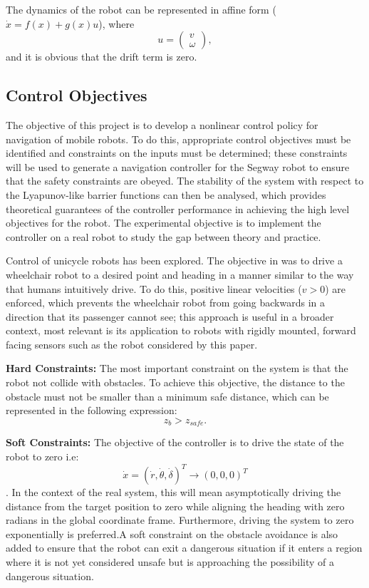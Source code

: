 \documentclass[journal]{IEEEtran}
\begin{document}
The dynamics of the robot can be represented in affine form ($\dot{x}=f(x)+g(x)u$), where \begin{equation}u=\left(\begin{matrix}
v\\\omega \end{matrix}\right),\end{equation} and it is obvious that the drift term is zero. 

\subsection{Control Objectives}
The objective of this project is to develop a nonlinear control policy for navigation of mobile robots. To do this, appropriate control objectives must be identified and constraints on the inputs must be determined; these constraints will be used to generate a navigation controller for the Segway robot to ensure that the safety constraints are obeyed. The stability of the system with respect to the Lyapunov-like barrier functions can then be analysed, which provides theoretical guarantees of the controller performance in achieving the high level objectives for the robot. The experimental objective is to implement the controller on a real robot to study the gap between theory and practice.

Control of unicycle robots has been explored. The objective in \cite{park2011} was to drive a wheelchair robot to a desired point and heading in a manner similar to the way that humans intuitively drive. To do this, positive linear velocities ($v>0$) are enforced, which prevents the wheelchair robot from going backwards in a direction that its passenger cannot see; this approach is useful in a broader context, most relevant is its application to robots with rigidly mounted, forward facing sensors such as the robot considered by this paper.

\textbf{Hard Constraints:} The most important constraint on the system is that the robot not collide with obstacles. To achieve this objective, the distance to the obstacle must not be smaller than a minimum safe distance, which can be represented in the following expression:
\begin{equation}
z_b>z_{safe}.
\end{equation}

\textbf{Soft Constraints:} The objective of the controller is to drive the state of the robot to zero i.e:
\begin{equation} \dot{x}=(\dot{r},\dot{\theta},\dot{\delta})^T \to (0, 0, 0)^T \end{equation}.
In the context of the real system, this will mean asymptotically driving the distance from the target position to zero while aligning the heading with zero radians in the global coordinate frame. Furthermore, driving the system to zero exponentially is preferred.A soft constraint on the obstacle avoidance is also added to ensure that the robot can exit a dangerous situation if it enters a region where it is not yet considered unsafe but is approaching the possibility of a dangerous situation.
\end{document}
